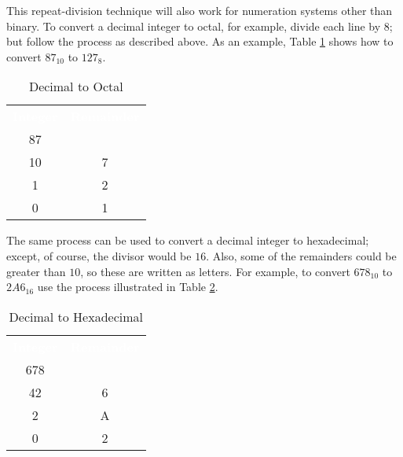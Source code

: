 This repeat-division technique will also work for numeration systems other than binary. To convert a decimal integer to octal, for example, divide each line by $ 8 $; but follow the process as described above. As an example, Table \ref{MF:tab:dec_to_oct} shows how to convert $ 87_{10} $ to $ 127_8 $.

\begin{table}[H]
  \sffamily
  \newcommand{\head}[1]{\textcolor{white}{\textbf{#1}}}    
  \begin{center}
    \begin{tabular}{ c c } 
      \hline
      \rowcolor{black!75}
      \head{Integer} & \head{Remainder} \\
      87 &  \\
      10 & 7 \\
      1 & 2 \\
      0 & 1 \\ \hline
    \end{tabular}
  \end{center}
  \caption{Decimal to Octal}
  \label{MF:tab:dec_to_oct}
\end{table}

The same process can be used to convert a decimal integer to hexadecimal; except, of course, the divisor would be $ 16 $. Also, some of the remainders could be greater than $ 10 $, so these are written as letters. For example, to convert $ 678_{10} $ to $ 2A6_{16} $ use the process illustrated in Table \ref{MF:tab:dec_to_hex}.

\begin{table}[H]
  \sffamily
  \newcommand{\head}[1]{\textcolor{white}{\textbf{#1}}}    
  \begin{center}
    \begin{tabular}{ c c } 
      \hline
      \rowcolor{black!75}
      \head{Integer} & \head{Remainder} \\
      678 &  \\
      42 & 6 \\
      2 & A \\
      0 & 2 \\ \hline
    \end{tabular}
  \end{center}
  \caption{Decimal to Hexadecimal}
  \label{MF:tab:dec_to_hex}
\end{table}

